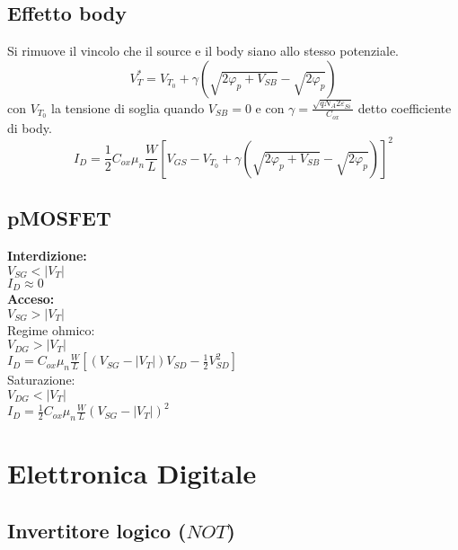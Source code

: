 \documentclass{article}
\begin{document}
\subsection*{Effetto body}
Si rimuove il vincolo che il source e il body siano allo stesso potenziale.
\begin{equation*}
V_T^* = V_{T_0} + \gamma \left( \sqrt{2\varphi_p + V_{SB}} - \sqrt{2\varphi_p} \right)
\end{equation*}
con $V_{T_0}$ la tensione di soglia quando $V_{SB} = 0$ e con $\gamma = \frac{\sqrt{qN_A 2\varepsilon_{Si}}}{C_{ox}}$ detto coefficiente di body.
\begin{equation*}
I_D = \frac{1}{2} C_{ox} \mu_n \frac{W}{L} \left[ V_{GS} - V_{T_0} + \gamma \left( \sqrt{2\varphi_p + V_{SB}} - \sqrt{2\varphi_p} \right) \right]^2
\end{equation*}

\subsection*{pMOSFET}
\textbf{Interdizione:}\\
\hspace*{2cm} $V_{SG} < |V_T|$\\
\hspace*{2cm} $I_D \approx 0$\\
\textbf{Acceso:}\\
\hspace*{2cm} $V_{SG} > |V_T|$\\
\hspace*{1cm} Regime ohmico:\\
\hspace*{2cm} $V_{DG} > |V_T|$\\
\hspace*{2cm} $I_D = C_{ox} \mu_n \frac{W}{L} \left[ (V_{SG} - |V_T|)V_{SD} - \frac{1}{2}V_{SD}^2 \right]$\\
\hspace*{1cm} Saturazione:\\
\hspace*{2cm} $V_{DG} < |V_T|$\\
\hspace*{2cm} $I_D = \frac{1}{2} C_{ox} \mu_n \frac{W}{L} (V_{SG} - |V_T|)^2$

\newpage
\section*{Elettronica Digitale}

\subsection*{Invertitore logico ($NOT$)}
\end{document}
